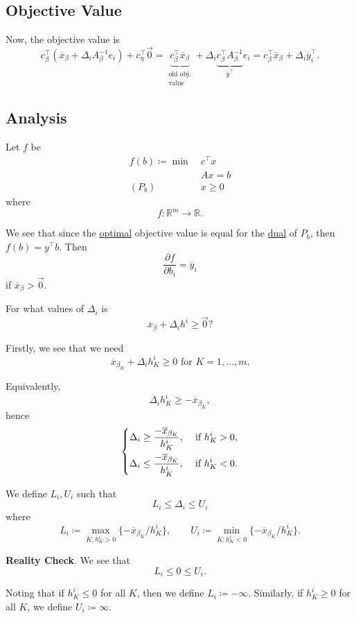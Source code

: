 \subsection{Objective Value}
Now, the objective value is
\[
	c_{\beta}^{\top}(\overline{x}_{\beta}+\Delta_{i}A_{\beta}^{-1}e_{i})+ c_{\eta}^{\top}\vec{0} = \underbrace{c_{\beta}^{\top}\overline{x}_{\beta}}_{\substack{\text{old obj.}\\\text{value}}}+\Delta_{i}\underbrace{c_{\beta}^{\top}A_{\beta}^{-1}}_{\overline{y}^{\top}}e_{i} = c_{\beta}^{\top}\overline{x}_{\beta}+\Delta_{i}\overline{y}^{\top}_i.
\]

\subsection{Analysis}
Let \(f\) be
\[
	\begin{aligned}
		f(b)\coloneqq \min~ & c^{\top}x \\
		                    & Ax = b    \\
		(P_b)\quad          & x\geq 0
	\end{aligned}
\]
where
\[
	f: \mathbb{R}^{m}\to \mathbb{R}.
\]

We see that since the \hyperref[def:optimal-solution]{optimal} objective value is equal for the \hyperref[def:dual]{dual} of \(P_b\), then \(f(b) = y^{\top}b\). Then
\[
	\frac{\partial f}{\partial b_{i}} = \overline{y}_i
\]
if \(\overline{x}_{\beta}>\vec{0}\).

\begin{problem}
For what values of \(\Delta_{i}\) is
\[
	\overline{x}_{\beta} + \Delta_{i}h^i \geq \vec{0}?
\]
\end{problem}
\begin{answer}
	Firstly, we see that we need
	\[
		\overline{x}_{\beta_K}+\Delta_{i}h^i_K \geq 0 \text{ for }K = 1, \ldots , m.
	\]

	Equivalently,
	\[
		\Delta_{i}h^i_K \geq -\overline{x}_{\beta_K},
	\]
	hence
	\[
		\begin{dcases}
			\Delta_{i}\geq \frac{-\overline{x}_{\beta_K}}{h^i_K}, & \text{ if }h^i_K>0, \\
			\Delta_{i}\leq \frac{-\overline{x}_{\beta_K}}{h^i_K}, & \text{ if }h^i_K<0.
		\end{dcases}
	\]

	We define \(L_{i}, U_{i}\) such that
	\[
		L_{i}\leq \Delta_{i}\leq U_{i}
	\]
	where
	\[
		L_{i} \coloneqq \max_{K\colon h^i_K > 0}\{-\overline{x}_{\beta_K}/h^i_K\},\qquad U_{i} \coloneqq \min_{K\colon h^i_K < 0}\{-\overline{x}_{\beta_K}/h^i_K\}.
	\]

	\textbf{Reality Check}. We see that
	\[
		L_{i}\leq 0\leq U_{i}.
	\]

	\begin{remark}
		Noting that if \(h^i_K\leq 0\) for all \(K\), then we define \(L_{i} \coloneqq -\infty \). Similarly, if \(h^i_K\geq 0\) for all \(K\), we define \(U_i \coloneqq \infty \).
	\end{remark}
\end{answer}


